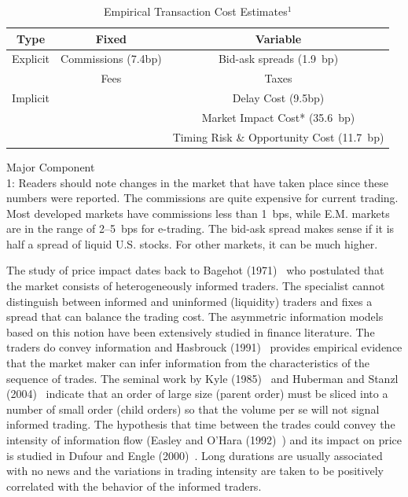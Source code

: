 	\begin{table}[!ht]
	\caption{Empirical Transaction Cost Estimates$^1$\label{tab:empttrans}}	
	\begin{tabular}{c|c|c}
	Type & Fixed & Variable \\ \hline 
	Explicit & Commissions (7.4bp) & Bid-ask spreads (1.9~bp) \\ 
	& Fees & Taxes \\ \hline 
	Implicit & & Delay Cost (9.5bp) \\ 
	& & Market Impact Cost* (35.6~bp) \\ 
	& & Timing Risk \& Opportunity Cost (11.7~bp) \\  
	\end{tabular}
	{\small *Major Component \\ 1: Readers should note changes in the market that have taken place since these numbers were reported. The commissions are quite expensive for current trading. Most developed markets  have commissions less than 1~bps, while E.M. markets are in the range of 2--5~bps for e-trading. The bid-ask spread makes sense if it is half a spread of liquid U.S. stocks. For other markets, it can be much higher.}
	\end{table}


The study of price impact dates back to Bagehot (1971)~\cite{bagehot} who postulated that the market consists of heterogeneously informed traders. The specialist cannot distinguish between informed and uninformed (liquidity) traders and fixes a spread that can balance the trading cost. The asymmetric information models based on this notion have been extensively studied in finance literature. The traders do convey information and Hasbrouck (1991)~\cite{hasbrouk} provides empirical evidence that the market maker can infer information from the characteristics of the sequence of trades. The seminal work by Kyle (1985)~\cite{kyle1985} and Huberman and Stanzl (2004)~\cite{huberstan} indicate that an order of large size (parent order) must be sliced into a number of small order (child orders) so that the volume per se will not signal informed trading. The hypothesis that time between the trades could convey the intensity of information flow (Easley and O'Hara (1992)~\cite{easleyo}) and its impact on price is studied in Dufour and Engle (2000)~\cite{dufour}. Long durations are usually associated with no news and the variations in trading intensity are taken to be positively correlated with the behavior of the informed traders. \twomedskip


